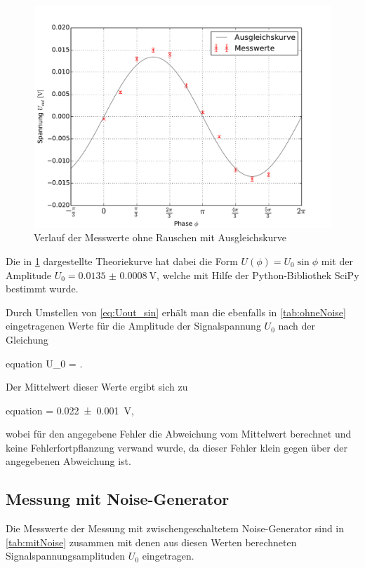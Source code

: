 		\begin{figure}[!h]
			\centering
			\includegraphics[scale=0.75]{Grafiken/OhneNoise.pdf}
			\caption{Verlauf der Messwerte ohne Rauschen mit Ausgleichskurve}
			\label{fig:ohneNoise}
		\end{figure} 
	
	Die in \cref{fig:ohneNoise} dargestellte Theoriekurve hat dabei die Form $U(\phi) = U_{0} \sin{\phi}$ mit 
	der Amplitude $U_{0} = \SI{0.0135(8)}{\volt}$, welche mit Hilfe der Python-Bibliothek SciPy \cite{SciPy} bestimmt wurde.
	
	Durch Umstellen von \cref{eq:Uout_sin} erhält man die ebenfalls in \cref{tab:ohneNoise} eingetragenen Werte für die 
	Amplitude der Signalspannung $U_{0}$ nach der Gleichung
	\begin{empheq}{equation}
			U_{0} = .
			\label{eq:U0}
	\end{empheq}  
	Der Mittelwert dieser Werte ergibt sich zu 
	\begin{empheq}{equation}
			 = \SI{0.022(1)}{V},
			\label{eq:U0_mean}
	\end{empheq}  	
	wobei für den angegebene Fehler die Abweichung vom Mittelwert berechnet und keine Fehlerfortpflanzung verwand wurde, da dieser 
	Fehler klein gegen über der angegebenen Abweichung ist.
	 
\subsection{Messung mit Noise-Generator}
	Die Messwerte der Messung mit zwischengeschaltetem Noise-Generator sind in \cref{tab:mitNoise} zusammen mit denen aus diesen
	Werten berechneten Signalspannungsamplituden $U_{0}$ eingetragen.
	
